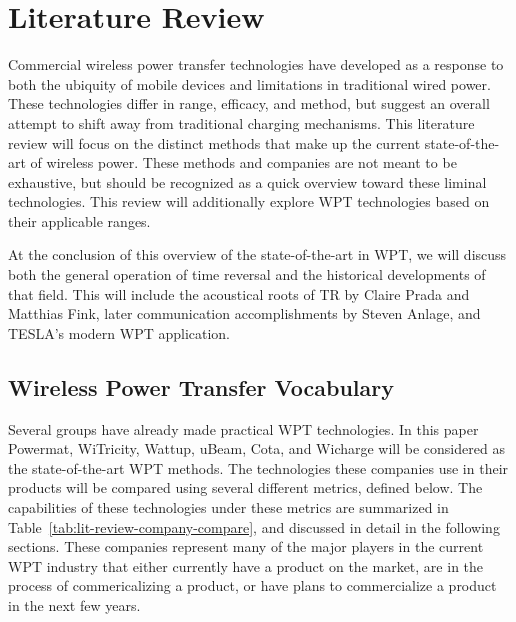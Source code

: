\chapter{Literature Review}
\label{ch:lit-review}

Commercial wireless power transfer technologies have developed as a response to both the ubiquity of mobile devices and limitations in traditional wired power. These technologies differ in range, efficacy, and method, but suggest an overall attempt to shift away from traditional charging mechanisms. This literature review will focus on the distinct methods that make up the current state-of-the-art of wireless power. These methods and companies are not meant to be exhaustive, but should be recognized as a quick overview toward these liminal technologies. This review will additionally explore WPT technologies based on their applicable ranges.

At the conclusion of this overview of the state-of-the-art in WPT, we will discuss both the general operation of time reversal and the historical developments of that field. This will include the acoustical roots of TR by Claire Prada and Matthias Fink, later communication accomplishments by Steven Anlage, and TESLA's modern WPT application.

\section{Wireless Power Transfer Vocabulary}

Several groups have already made practical WPT technologies. In this paper Powermat, WiTricity, Wattup, uBeam, Cota, and Wicharge will be considered as the state-of-the-art WPT methods. The technologies these companies use in their products will be compared using several different metrics, defined below. The capabilities of these technologies under these metrics are summarized in Table~\ref{tab:lit-review-company-compare}, and discussed in detail in the following sections. These companies represent many of the major players in the current WPT industry that either currently have a product on the market, are in the process of commericalizing a product, or have plans to commercialize a product in the next few years.

